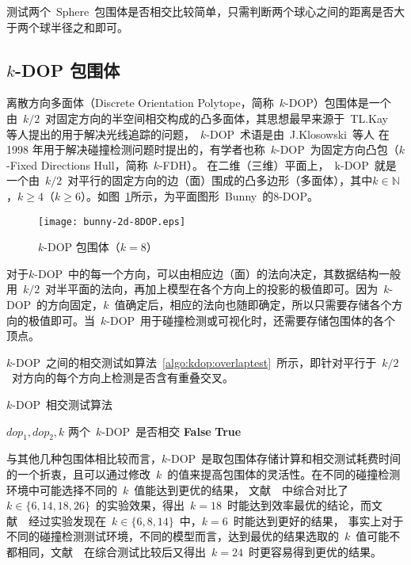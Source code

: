 测试两个~Sphere~包围体是否相交比较简单，只需判断两个球心之间的距离是否大于两个球半径之和即可。

\subsection{$k$-DOP 包围体}

离散方向多面体（Discrete Orientation Polytope，简称~$k$-DOP）包围体是一个由~$k/2$~对固定方向的半空间相交构成的凸多面体，其思想最早来源于~TL.Kay~\cite{Kay1986Ray}
等人提出的用于解决光线追踪的问题，~$k$-DOP~术语是由~J.Klosowski~等人\cite{klosowski1998efficient}
在1998 年用于解决碰撞检测问题时提出的，有学者也称~$k$-DOP~为固定方向凸包（$k$-Fixed
Directions Hull，简称~$k$-FDH）\cite{weiyingmei2001}。
在二维（三维）平面上，~k-DOP~就是一个由~$k/2$~对平行的固定方向的边（面）围成的凸多边形（多面体），其中$k\in\mathbb{N}$，$k\geq4$（$k\geq6$）。如图~\ref{fig:8dop-bunny}所示，为平面图形~Bunny~的$8$-DOP。
\begin{figure}[H] %
  \centering
  \texttt{[image: bunny-2d-8DOP.eps]}
  \caption{$k$-DOP 包围体（$k=8$）}
  \label{fig:8dop-bunny}
\end{figure}
对于$k$-DOP~中的每一个方向，可以由相应边（面）的法向决定，其数据结构一般用~$k/2$~对半平面的法向，再加上模型在各个方向上的投影的极值即可。因为~$k$-DOP~的方向固定，$k$~值确定后，相应的法向也随即确定，所以只需要存储各个方向的极值即可。当~$k$-DOP~用于碰撞检测或可视化时，还需要存储包围体的各个顶点。

$k$-DOP~之间的相交测试如算法~\ref{algo:kdop:overlaptest}~所示\cite{ericson2005real}，即针对平行于~$k/2$~对方向的每个方向上检测是否含有重叠交叉。
\begin{algorithm}
\caption{$k$-DOP~相交测试算法}
\small
\label{algo:kdop:overlaptest}
\begin{algorithmic}[1]
\Require
$dop_1, dop_2, k$ 
\Ensure
两个~$k$-DOP~是否相交
          \State \Return \textbf{False} 
      \EndIf
  \EndFor
  \State \Return \textbf{True} 
\EndFunction
\end{algorithmic}
\end{algorithm}
与其他几种包围体相比较而言，$k$-DOP~是取包围体存储计算和相交测试耗费时间的一个折衷，且可以通过修改~$k$~的值来提高包围体的灵活性。在不同的碰撞检测环境中可能选择不同的~$k$~值能达到更优的结果，
文献~~中综合对比了~$k \in \{6,14,18,26\}$~的实验效果，得出~$k=18$~时能达到效率最优的结论，而文献~~经过实验发现在~$k \in \{6,8,14\}$~中，$k=6$~时能达到更好的结果，
事实上对于不同的碰撞检测测试环境，不同的模型而言，达到最优的结果选取的~$k$~值可能不都相同，文献~~在综合测试比较后又得出~$k=24$~时更容易得到更优的结果。

